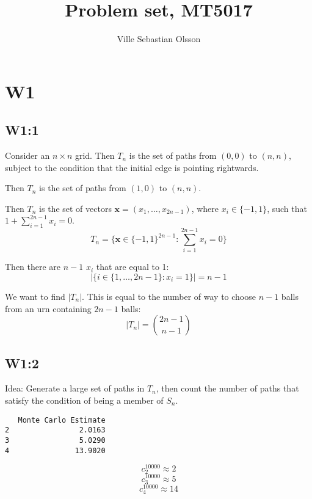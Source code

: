\documentclass{article}
\title{Problem set, MT5017}
\author{Ville Sebastian Olsson}
\begin{document}
\maketitle
\tableofcontents

\section{W1}

\subsection{W1:1}

Consider an \(n\times n\) grid.
Then \(T_n\) is the set of paths from \((0,0)\) to \((n,n)\),
subject to the condition that the initial edge is pointing rightwards.

Then \(T_n\) is the set of paths from \((1,0)\) to \((n,n)\).

Then \(T_n\) is the set of vectors \(\mathbf{x} = (x_1,\ldots,x_{2n-1})\),
where \(x_i\in \{-1,1\}\),
such that \(1+\sum_{i=1}^{2n-1} x_i = 0\).
\[T_n = \{ \mathbf{x}\in \{-1,1\}^{2n-1}: \sum_{i=1}^{2n-1} x_i = 0\}\]

Then there are \(n-1\) \(x_i\) that are equal to 1:
\[|\{i \in \{1,\ldots,2n-1\}: x_i = 1\}| = n-1\]

We want to find \(|T_n|\). This is equal to the number of way to choose \(n-1\) balls
from an urn containing \(2n-1\) balls:
\[|T_n| = \binom{2n-1}{n-1}\]

\subsection{W1:2}

Idea: Generate a large set of paths in \(T_n\), then
count the number of paths that satisfy the condition of being a member of \(S_n\).

\begin{minipage}{\linewidth}
\begin{lstlisting}
   Monte Carlo Estimate
2                2.0163
3                5.0290
4               13.9020
\end{lstlisting}
\end{minipage}

\[c_2^{10000} \approx 2\]
\[c_3^{10000} \approx 5\]
\[c_4^{10000} \approx 14\]
\end{document}
